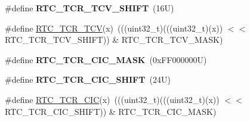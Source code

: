 \begin{DoxyCompactItemize}
\#define {\bfseries R\+T\+C\+\_\+\+T\+C\+R\+\_\+\+T\+C\+V\+\_\+\+S\+H\+I\+FT}~(16\+U)
\item 
\#define \mbox{\hyperlink{group___r_t_c___register___masks_gaa8994c74539b06641e723be00af76459}{R\+T\+C\+\_\+\+T\+C\+R\+\_\+\+T\+CV}}(x)~(((uint32\+\_\+t)(((uint32\+\_\+t)(x)) $<$$<$ R\+T\+C\+\_\+\+T\+C\+R\+\_\+\+T\+C\+V\+\_\+\+S\+H\+I\+FT)) \& R\+T\+C\+\_\+\+T\+C\+R\+\_\+\+T\+C\+V\+\_\+\+M\+A\+SK)
\item 
\mbox{\label{group___r_t_c___register___masks_ga788e49f72c48b3c98794b49e27337c64}} 
\#define {\bfseries R\+T\+C\+\_\+\+T\+C\+R\+\_\+\+C\+I\+C\+\_\+\+M\+A\+SK}~(0x\+F\+F000000\+U)
\item 
\mbox{\label{group___r_t_c___register___masks_ga84c801695fa1e344e7b2c8e6568cb7c8}} 
\#define {\bfseries R\+T\+C\+\_\+\+T\+C\+R\+\_\+\+C\+I\+C\+\_\+\+S\+H\+I\+FT}~(24\+U)
\item 
\#define \mbox{\hyperlink{group___r_t_c___register___masks_ga650d1b34ad6d46090befda0296b4fe3f}{R\+T\+C\+\_\+\+T\+C\+R\+\_\+\+C\+IC}}(x)~(((uint32\+\_\+t)(((uint32\+\_\+t)(x)) $<$$<$ R\+T\+C\+\_\+\+T\+C\+R\+\_\+\+C\+I\+C\+\_\+\+S\+H\+I\+FT)) \& R\+T\+C\+\_\+\+T\+C\+R\+\_\+\+C\+I\+C\+\_\+\+M\+A\+SK)
\end{DoxyCompactItemize}
